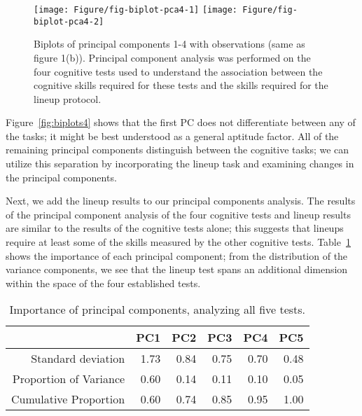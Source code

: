\documentclass[journal]{vgtc}\usepackage[]{graphicx}\usepackage[]{color}
\newenvironment{knitrout}{}{} %
\begin{document}
\begin{knitrout}
\color{fgcolor}\begin{figure}

{\centering \texttt{[image: Figure/fig-biplot-pca4-1]} 
\texttt{[image: Figure/fig-biplot-pca4-2]} 

}

\caption{Biplots of principal components 1-4 with observations (same as figure 1(b)). Principal component analysis was performed on the four cognitive tests used to understand the association between the cognitive skills required for these tests and the skills required for the lineup protocol.  \label{fig:biplots4}}\label{fig:biplot-pca4}
\end{figure}


\end{knitrout}
Figure~\ref{fig:biplots4} shows that the first PC does not differentiate between any of the tasks; it might be best understood as a general aptitude factor. All of the remaining principal components distinguish between the cognitive tasks; we can utilize this separation by incorporating the lineup task and examining changes in the principal components. 

Next, we add the lineup results to our principal components analysis. The results of the principal component analysis of the four cognitive tests and lineup results are similar to the results of the cognitive tests alone; this suggests that lineups require at least some of the skills measured by the other cognitive tests. Table~\ref{tab:PCAvariance5} shows the importance of each principal component; from the distribution of the variance components, we see that the lineup test spans an additional dimension within the space of the four established tests. 
\begin{table}[ht]
\centering
\caption{Importance of principal components, analyzing all five tests.\label{tab:PCAvariance5}} 
{\footnotesize
\begin{tabular}{rrrrrr}
  \hline
 & PC1 & PC2 & PC3 & PC4 & PC5 \\ 
  \hline
Standard deviation & 1.73 & 0.84 & 0.75 & 0.70 & 0.48 \\ 
  Proportion of Variance & 0.60 & 0.14 & 0.11 & 0.10 & 0.05 \\ 
  Cumulative Proportion & 0.60 & 0.74 & 0.85 & 0.95 & 1.00 \\ 
   \hline
\end{tabular}
}
\end{table}
\end{document}

